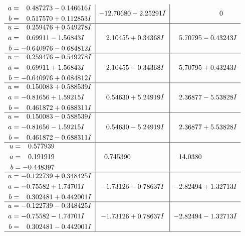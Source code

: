 \documentclass[1p]{elsarticle_modified}
\theoremstyle{definition}
\begin{document}
$$\begin{array}{c|c|c}
\begin{aligned}
a &= \phantom{-}0.487273 - 0.146616 I \\
b &= \phantom{-}0.517570 + 0.112853 I\end{aligned}
 & -12.70680 - 2.25291 I & \phantom{-0.000000 } 0 \\ \hline\begin{aligned}
u &= \phantom{-}0.259476 + 0.549278 I \\
a &= \phantom{-}0.69911 - 1.56843 I \\
b &= -0.640976 - 0.684812 I\end{aligned}
 & \phantom{-}2.10455 + 0.34368 I & \phantom{-}5.70795 - 0.43243 I \\ \hline\begin{aligned}
u &= \phantom{-}0.259476 - 0.549278 I \\
a &= \phantom{-}0.69911 + 1.56843 I \\
b &= -0.640976 + 0.684812 I\end{aligned}
 & \phantom{-}2.10455 - 0.34368 I & \phantom{-}5.70795 + 0.43243 I \\ \hline\begin{aligned}
u &= \phantom{-}0.150083 + 0.588539 I \\
a &= -0.81656 + 1.59215 I \\
b &= \phantom{-}0.461872 + 0.688311 I\end{aligned}
 & \phantom{-}0.54630 + 5.24919 I & \phantom{-}2.36877 - 5.53828 I \\ \hline\begin{aligned}
u &= \phantom{-}0.150083 - 0.588539 I \\
a &= -0.81656 - 1.59215 I \\
b &= \phantom{-}0.461872 - 0.688311 I\end{aligned}
 & \phantom{-}0.54630 - 5.24919 I & \phantom{-}2.36877 + 5.53828 I \\ \hline\begin{aligned}
u &= \phantom{-}0.577939\phantom{ +0.000000I} \\
a &= \phantom{-}0.191919\phantom{ +0.000000I} \\
b &= -0.448397\phantom{ +0.000000I}\end{aligned}
 & \phantom{-}0.745390\phantom{ +0.000000I} & \phantom{-}14.0380\phantom{ +0.000000I} \\ \hline\begin{aligned}
u &= -0.122739 + 0.348425 I \\
a &= -0.75582 + 1.74701 I \\
b &= \phantom{-}0.302481 + 0.442001 I\end{aligned}
 & -1.73126 - 0.78637 I & -2.82494 + 1.32713 I \\ \hline\begin{aligned}
u &= -0.122739 - 0.348425 I \\
a &= -0.75582 - 1.74701 I \\
b &= \phantom{-}0.302481 - 0.442001 I\end{aligned}
 & -1.73126 + 0.78637 I & -2.82494 - 1.32713 I\\
 \hline 
 \end{array}$$\newpage\newpage\renewcommand{\arraystretch}{1}
\end{document}
